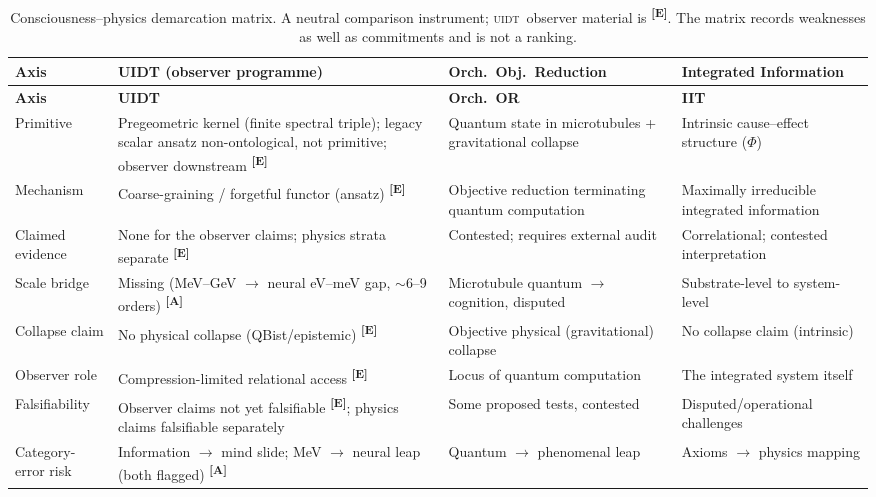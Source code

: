 \documentclass[12pt,a4paper,twoside]{article}
\theoremstyle{plain}
\theoremstyle{definition}
\theoremstyle{remark}
\newcommand{\UIDT}{\textsc{uidt}}
\newcommand{\catmark}[1]{\textsuperscript{\textsf{\textbf{[#1]}}}}
\begin{document}
{\small
\renewcommand{\arraystretch}{1.3}
\begin{longtable}{p{} p{} p{} p{}}
\caption{Consciousness--physics demarcation matrix. A neutral comparison
instrument; \UIDT\ observer material is \catmark{E}. The matrix records
weaknesses as well as commitments and is not a ranking.}
\label{tab:demarcation-matrix}\\
\toprule
\textbf{Axis} & \textbf{UIDT (observer programme)} & \textbf{Orch.\ Obj.\ Reduction} &
\textbf{Integrated Information} \\
\midrule
\endfirsthead
\toprule
\textbf{Axis} & \textbf{UIDT} & \textbf{Orch.\ OR} & \textbf{IIT} \\
\midrule
\endhead
\bottomrule
\endfoot
Primitive & Pregeometric kernel (finite spectral triple); legacy scalar ansatz non-ontological,
not primitive; observer downstream \catmark{E} & Quantum state in
microtubules + gravitational collapse & Intrinsic cause--effect structure
($\Phi$) \\
Mechanism & Coarse-graining / forgetful functor (ansatz) \catmark{E} &
Objective reduction terminating quantum computation & Maximally irreducible
integrated information \\
Claimed evidence & None for the observer claims; physics strata separate
\catmark{E} & Contested; requires external audit & Correlational; contested
interpretation \\
Scale bridge & Missing (MeV--GeV $\to$ neural eV--meV gap, $\sim$6--9
orders) \catmark{A} & Microtubule quantum $\to$ cognition, disputed &
Substrate-level to system-level \\
Collapse claim & No physical collapse (QBist/epistemic) \catmark{E} &
Objective physical (gravitational) collapse & No collapse claim (intrinsic) \\
Observer role & Compression-limited relational access \catmark{E} & Locus of
quantum computation & The integrated system itself \\
Falsifiability & Observer claims not yet falsifiable \catmark{E}; physics
claims falsifiable separately & Some proposed tests, contested &
Disputed/operational challenges \\
Category-error risk & Information $\to$ mind slide; MeV $\to$ neural leap
(both flagged) \catmark{A} & Quantum $\to$ phenomenal leap & Axioms $\to$
physics mapping \\
\bottomrule
\end{longtable}
}
\end{document}
